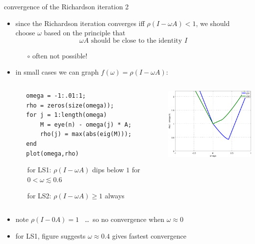 \documentclass[10pt,hyperref]{beamer}
\begin{document}
\begin{frame}[fragile]{convergence of the Richardson iteration 2}

\begin{itemize}
\item since the Richardson iteration converges iff $\rho(I - \omega A)<1$, we should choose $\omega$ based on the principle that
    $$\omega A \text{ should be close to the identity } I$$
\vspace{-5mm}
  \begin{itemize}
  \item[$\circ$] often not possible!
  \end{itemize}

\medskip
\item in small cases we can graph $f(\omega) = \rho(I-\omega A)$:

\medskip
\begin{columns}
\begin{column}{0.5\textwidth}
\footnotesize
\begin{verbatim}
   omega = -1:.01:1;
   rho = zeros(size(omega));
   for j = 1:length(omega)
       M = eye(n) - omega(j) * A;
       rho(j) = max(abs(eig(M)));
   end
   plot(omega,rho)
\end{verbatim}

\smallskip
\begin{itemize}
\footnotesize
\item[for LS1:]  $\rho(I - \omega A)$ dips below $1$ for $0 < \omega \lesssim 0.6$
\item[for LS2:]  $\rho(I - \omega A) \ge 1$ always
\end{itemize}
\end{column}

\begin{column}{0.4\textwidth}
\includegraphics[width=2.0in,keepaspectratio=true]{richardspect}
\end{column}
\end{columns}

\medskip
\item  note $\rho(I-0A)=1$ \, \dots \, so no convergence when $\omega \approx 0$
\item  for LS1, figure suggests $\omega \approx 0.4$ gives fastest convergence
\end{itemize}
\end{frame}
\end{document}
